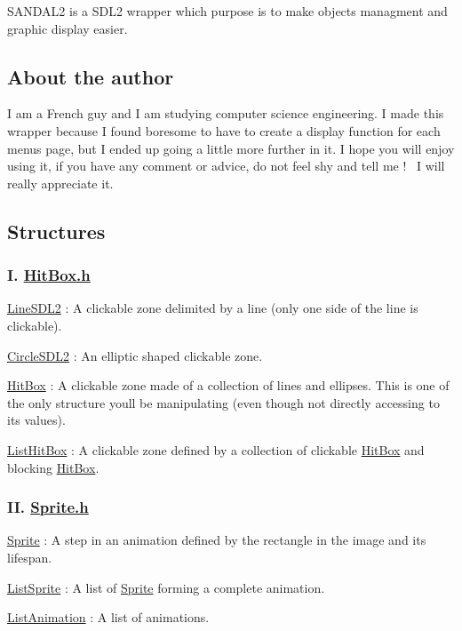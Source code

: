 S\+A\+N\+D\+A\+L2 is a S\+D\+L2 wrapper which purpose is to make objects managment and graphic display easier.

\subsection*{About the author}

I am a French guy and I am studying computer science engineering. I made this wrapper because I found boresome to have to create a display function for each menu\textquotesingle{}s page, but I ended up going a little more further in it. I hope you will enjoy using it, if you have any comment or advice, do not feel shy and tell me !~\newline
 I will really appreciate it.

\subsection*{Structures}

\subsubsection*{I. \hyperlink{HitBox_8h}{Hit\+Box.\+h}}


\begin{DoxyEnumerate}
\item \hyperlink{structLineSDL2}{Line\+S\+D\+L2} \+: A clickable zone delimited by a line (only one side of the line is clickable).
\item \hyperlink{structCircleSDL2}{Circle\+S\+D\+L2} \+: An elliptic shaped clickable zone.
\item \hyperlink{structHitBox}{Hit\+Box} \+: A clickable zone made of a collection of lines and ellipses. This is one of the only structure you\textquotesingle{}ll be manipulating (even though not directly accessing to its values).
\item \hyperlink{structListHitBox}{List\+Hit\+Box} \+: A clickable zone defined by a collection of clickable \hyperlink{structHitBox}{Hit\+Box} and blocking \hyperlink{structHitBox}{Hit\+Box}.
\end{DoxyEnumerate}

\subsubsection*{II. \hyperlink{Sprite_8h}{Sprite.\+h}}


\begin{DoxyEnumerate}
\item \hyperlink{structSprite}{Sprite} \+: A step in an animation defined by the rectangle in the image and its lifespan.
\item \hyperlink{structListSprite}{List\+Sprite} \+: A list of \hyperlink{structSprite}{Sprite} forming a complete animation.
\item \hyperlink{structListAnimation}{List\+Animation} \+: A list of animations.
\end{DoxyEnumerate}

